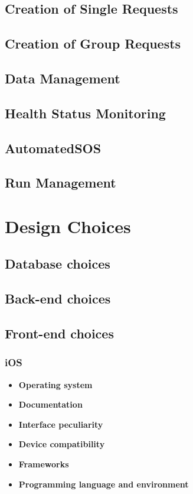 \documentclass[titlepage]{article}
\begin{document}
\subsection{Creation of Single Requests}
\subsection{Creation of Group Requests}
\subsection{Data Management}
\subsection{Health Status Monitoring}
\subsection{AutomatedSOS}
\subsection{Run Management}

\pagebreak
\section{Design Choices}
\subsection{Database choices}
\subsection{Back-end choices}
\subsection{Front-end choices}
\subsubsection{\bf iOS}
\begin{itemize}
	\item {\bf Operating system}
	\item {\bf Documentation}
	\item {\bf Interface peculiarity}
	\item {\bf Device compatibility}
	\item {\bf Frameworks}
	\item {\bf Programming language and environment}
\end{itemize}
\end{document}
